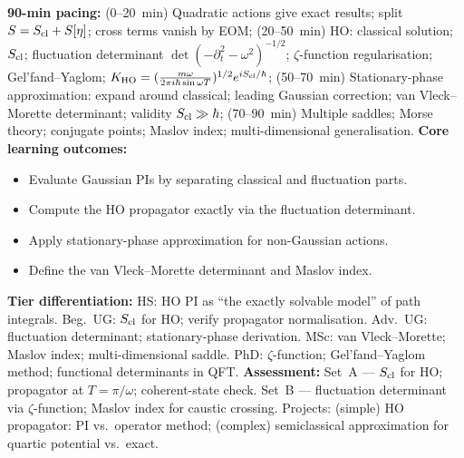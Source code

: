 \documentclass[11pt,a4paper]{article}
\begin{document}
\begin{tcolorbox}[modulebox, title={Module~II.2 --- Lecture L03: Gaussian Path Integrals}]
\textbf{90-min pacing:} (0--20~min) Quadratic actions give exact results; split $S=S_{\rm cl}+S[\eta]$; cross terms vanish by EOM; (20--50~min) HO: classical solution; $S_{\rm cl}$; fluctuation determinant $\det(-\partial_t^2-\omega^2)^{-1/2}$; $\zeta$-function regularisation; Gel'fand--Yaglom; $K_{\rm HO}=(\tfrac{m\omega}{2\pi i\hbar\sin\omega T})^{1/2}e^{iS_{\rm cl}/\hbar}$; (50--70~min) Stationary-phase approximation: expand around classical; leading Gaussian correction; van Vleck--Morette determinant; validity $S_{\rm cl}\gg\hbar$; (70--90~min) Multiple saddles; Morse theory; conjugate points; Maslov index; multi-dimensional generalisation.
\medskip\textbf{Core learning outcomes:}
\begin{itemize}[leftmargin=1.4em,topsep=2pt,itemsep=1pt]
  \item Evaluate Gaussian PIs by separating classical and fluctuation parts.
  \item Compute the HO propagator exactly via the fluctuation determinant.
  \item Apply stationary-phase approximation for non-Gaussian actions.
  \item Define the van Vleck--Morette determinant and Maslov index.
\end{itemize}
\medskip\textbf{Tier differentiation:}
HS: HO PI as ``the exactly solvable model'' of path integrals.
Beg.\ UG: $S_{\rm cl}$ for HO; verify propagator normalisation.
Adv.\ UG: fluctuation determinant; stationary-phase derivation.
MSc: van Vleck--Morette; Maslov index; multi-dimensional saddle.
PhD: $\zeta$-function; Gel'fand--Yaglom method; functional determinants in QFT.
\medskip\textbf{Assessment:}
Set~A --- $S_{\rm cl}$ for HO; propagator at $T=\pi/\omega$; coherent-state check.
Set~B --- fluctuation determinant via $\zeta$-function; Maslov index for caustic crossing.
Projects: (simple) HO propagator: PI vs.\ operator method; (complex) semiclassical approximation for quartic potential vs.\ exact.
\end{tcolorbox}

\medskip
\end{document}
